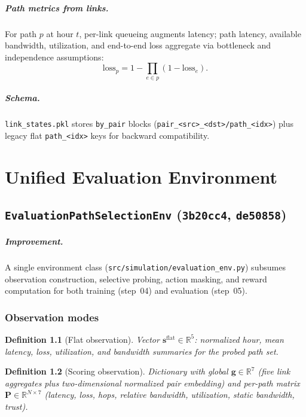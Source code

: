 \documentclass[11pt,a4paper,twoside,openright]{report}
\newtheorem{definition}{Definition}[chapter]
\begin{document}
\paragraph{Path metrics from links.}
For path $p$ at hour $t$, per-link queueing augments latency; path latency, available
bandwidth, utilization, and end-to-end loss aggregate via bottleneck and independence
assumptions:
\[
  \text{loss}_p = 1 - \prod_{e \in p} (1 - \text{loss}_e).
\]

\paragraph{Schema.}
\texttt{link\_states.pkl} stores \texttt{by\_pair} blocks
(\texttt{pair\_<src>\_<dst>/path\_<idx>}) plus legacy flat \texttt{path\_<idx>} keys
for backward compatibility.

\chapter{Unified Evaluation Environment}

\section{\texttt{EvaluationPathSelectionEnv} (\texttt{3b20cc4}, \texttt{de50858})}

\paragraph{Improvement.}
A single environment class (\texttt{src/simulation/evaluation\_env.py}) subsumes
observation construction, selective probing, action masking, and reward computation
for both training (step~04) and evaluation (step~05).

\subsection{Observation modes}

\begin{definition}[Flat observation]
Vector $\mathbf{s}^{\mathrm{flat}} \in \mathbb{R}^{5}$: normalized hour, mean latency,
loss, utilization, and bandwidth summaries for the probed path set.
\end{definition}

\begin{definition}[Scoring observation]
Dictionary with global $\mathbf{g} \in \mathbb{R}^{7}$ (five link aggregates plus
two-dimensional normalized pair embedding) and per-path matrix
$\mathbf{P} \in \mathbb{R}^{N \times 7}$ (latency, loss, hops, relative bandwidth,
utilization, static bandwidth, trust).
\end{definition}
\end{document}
